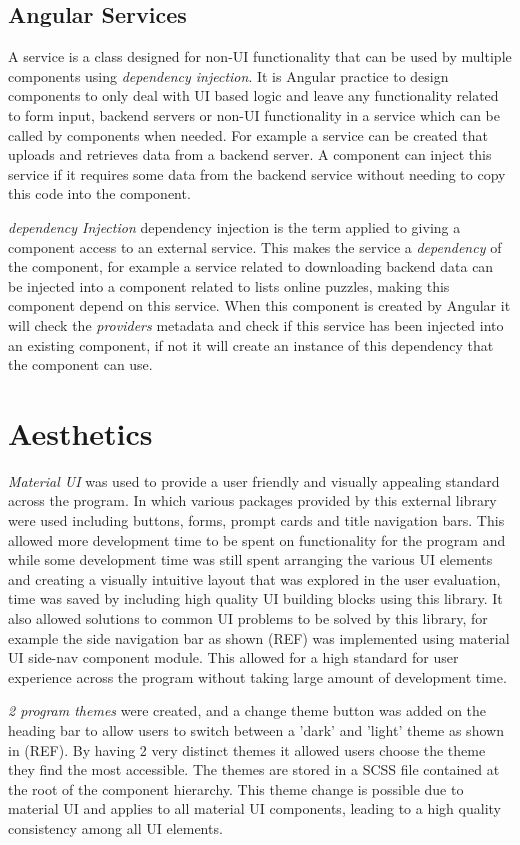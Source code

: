 \documentclass{l4proj}
\begin{document}
\subsection{Angular Services}
A service is a class designed for non-UI functionality that can be used by multiple components using \emph{dependency injection}. It is Angular practice to design components to only deal with UI based logic and leave any functionality related to form input, backend servers or non-UI functionality in a service which can be called by components when needed. For example a service can be created that uploads and retrieves data from a backend server. A component can inject this service if it requires some data from the backend service without needing to copy this code into the component. 

\emph{dependency Injection}
dependency injection is the term applied to giving a component access to an external service. This makes the service a \emph{dependency} of the component, for example a service related to downloading backend data can be injected into a component related to lists online puzzles, making this component depend on this service. When this component is created by Angular it will check the \emph{providers} metadata and check if this service has been injected into an existing component, if not it will create an instance of this dependency that the component can use. 

\section{Aesthetics}
\emph{Material UI} was used to provide a user friendly and visually appealing standard across the program. In which various packages provided by this external library were used including buttons, forms, prompt cards and title navigation bars. This allowed more development time to be spent on functionality for the program and while some development time was still spent arranging the various UI elements and creating a visually intuitive layout that was explored in the user evaluation, time was saved by including high quality UI building blocks using this library. It also allowed solutions to common UI problems to be solved by this library, for example the side navigation bar as shown (REF) was implemented using material UI side-nav component module. This allowed for a high standard for user experience across the program without taking large amount of development time.

\emph{2 program themes} were created, and a change theme button was added on the heading bar to allow users to switch between a 'dark' and 'light' theme as shown in (REF). By having 2 very distinct themes it allowed users choose the theme they find the most accessible. The themes are stored in a SCSS file contained at the root of the component hierarchy. This theme change is possible due to material UI and applies to all material UI components, leading to a high quality consistency among all UI elements.
\end{document}
